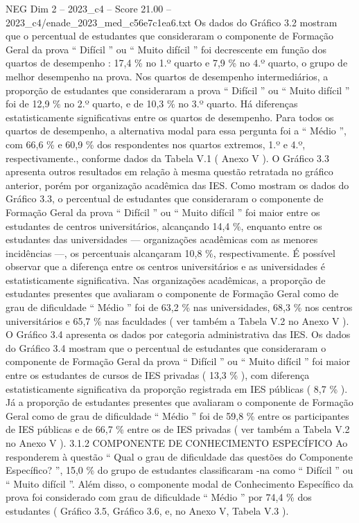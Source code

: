 \begin{textsample}{NEG Dim 2 – 2023\_c4 – Score 21.00 – 2023\_c4/enade\_2023\_med\_c56e7c1ea6.txt}
Os dados do Gráfico 3.2 mostram que o percentual de estudantes que consideraram o componente de Formação Geral da prova “ Difícil ” ou “ Muito difícil ” foi decrescente em função dos quartos de desempenho : 17,4 \% no 1.º quarto e 7,9 \% no 4.º quarto, o grupo de melhor desempenho na prova.
Nos quartos de desempenho intermediários, a proporção de estudantes que consideraram a prova “ Difícil ” ou “ Muito difícil ” foi de 12,9 \% no 2.º quarto, e de 10,3 \% no 3.º quarto.
Há diferenças estatisticamente significativas entre os quartos de desempenho.
Para todos os quartos de desempenho, a alternativa modal para essa pergunta foi a “ Médio ”, com 66,6 \% e 60,9 \% dos respondentes nos quartos extremos, 1.º e 4.º, respectivamente., conforme dados da Tabela V.1 ( Anexo V ).
O Gráfico 3.3 apresenta outros resultados em relação à mesma questão retratada no gráfico anterior, porém por organização acadêmica das IES.
Como mostram os dados do Gráfico 3.3, o percentual de estudantes que consideraram o componente de Formação Geral da prova “ Difícil ” ou “ Muito difícil ” foi maior entre os estudantes de centros universitários, alcançando 14,4 \%, enquanto entre os estudantes das universidades — organizações acadêmicas com as menores incidências —, os percentuais alcançaram 10,8 \%, respectivamente.
É possível observar que a diferença entre os centros universitários e as universidades é estatisticamente significativa.
Nas organizações acadêmicas, a proporção de estudantes presentes que avaliaram o componente de Formação Geral como de grau de dificuldade “ Médio ” foi de 63,2 \% nas universidades, 68,3 \% nos centros universitários e 65,7 \% nas faculdades ( ver também a Tabela V.2 no Anexo V ).
O Gráfico 3.4 apresenta os dados por categoria administrativa das IES.
Os dados do Gráfico 3.4 mostram que o percentual de estudantes que consideraram o componente de Formação Geral da prova “ Difícil ” ou “ Muito difícil ” foi maior entre os estudantes de cursos de IES privadas ( 13,3 \% ), com diferença estatisticamente significativa da proporção registrada em IES públicas ( 8,7 \% ).
Já a proporção de estudantes presentes que avaliaram o componente de Formação Geral como de grau de dificuldade “ Médio ” foi de 59,8 \% entre os participantes de IES públicas e de 66,7 \% entre os de IES privadas ( ver também a Tabela V.2 no Anexo V ). 3.1.2 COMPONENTE DE CONHECIMENTO ESPECÍFICO Ao responderem à questão “ Qual o grau de dificuldade das questões do Componente Específico? ”, 15,0 \% do grupo de estudantes classificaram -na como “ Difícil ” ou “ Muito difícil ”.
Além disso, o componente modal de Conhecimento Específico da prova foi considerado com grau de dificuldade “ Médio ” por 74,4 \% dos estudantes ( Gráfico 3.5, Gráfico 3.6, e, no Anexo V, Tabela V.3 ).

\end{textsample}
